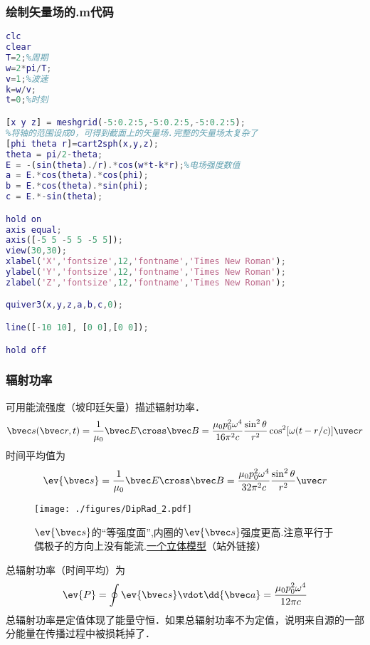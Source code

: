 \subsubsection{绘制矢量场的.m代码}
\begin{lstlisting}[language=matlab]
clc
clear
T=2;%周期
w=2*pi/T;
v=1;%波速
k=w/v;
t=0;%时刻

[x y z] = meshgrid(-5:0.2:5,-5:0.2:5,-5:0.2:5);
%将轴的范围设成0，可得到截面上的矢量场.完整的矢量场太复杂了
[phi theta r]=cart2sph(x,y,z);
theta = pi/2-theta;
E = -(sin(theta)./r).*cos(w*t-k*r);%电场强度数值
a = E.*cos(theta).*cos(phi);
b = E.*cos(theta).*sin(phi);
c = E.*-sin(theta);

hold on
axis equal;
axis([-5 5 -5 5 -5 5]);
view(30,30);
xlabel('X','fontsize',12,'fontname','Times New Roman');
ylabel('Y','fontsize',12,'fontname','Times New Roman');
zlabel('Z','fontsize',12,'fontname','Times New Roman');

quiver3(x,y,z,a,b,c,0);

line([-10 10], [0 0],[0 0]);

hold off

\end{lstlisting}


\subsubsection{辐射功率}
可用能流强度（坡印廷矢量）描述辐射功率．
\begin{equation}
\bvec s(\bvec r, t) = \frac{1}{\mu_0} \bvec E \cross \bvec B = \frac{\mu_0p_0^2\omega^4}{16\pi^2c} \frac{\sin^2\theta}{r^2} \cos^2[\omega(t - r/c)] \uvec r
\end{equation}
时间平均值为
\begin{equation}
\ev{\bvec s} = \frac{1}{\mu_0} \bvec E \cross \bvec B
= \frac{\mu_0p_0^2\omega^4}{32\pi^2c} \frac{\sin^2\theta}{r^2} \uvec r
\end{equation}

\begin{figure}[ht]
\centering
\texttt{[image: ./figures/DipRad\_2.pdf]}
\caption{$\ev{\bvec s}$的“等强度面”,内圈的$\ev{\bvec s}$强度更高.注意平行于偶极子的方向上没有能流.\href{https://www.geogebra.org/m/semmtxm5}{一个立体模型}（站外链接）} \label{DipRad_fig2}
\end{figure}
总辐射功率（时间平均）为
\begin{equation}
\ev{P} = \oint \ev{\bvec s} \vdot \dd{\bvec a} = \frac{\mu_0 p_0^2 \omega^4}{12\pi c}
\end{equation}
总辐射功率是定值体现了能量守恒．如果总辐射功率不为定值，说明来自源的一部分能量在传播过程中被损耗掉了．
